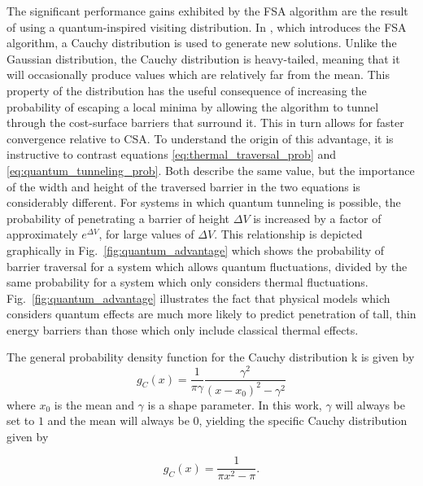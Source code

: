 \documentclass[11pt]{afthesis}
\begin{document}
	 The significant performance gains exhibited by the FSA algorithm are the result of using a quantum-inspired visiting distribution. In \cite{szu1987fastsimulatedannealing}, which introduces the FSA algorithm, a Cauchy distribution is used to generate new solutions. Unlike the Gaussian distribution, the Cauchy distribution is heavy-tailed, meaning that it will occasionally produce values which are relatively far from the mean.  This property of the distribution has the useful consequence of increasing the probability of escaping a local minima by allowing the algorithm to tunnel through the cost-surface barriers that surround it. This in turn allows for faster convergence relative to CSA. To understand the origin of this advantage, it is instructive to contrast equations \ref{eq:thermal_traversal_prob} and \ref{eq:quantum_tunneling_prob}. Both describe the same value, but the importance of the width and height of the traversed barrier in the two equations is considerably different. For systems in which quantum tunneling is possible, the probability of penetrating a barrier of height \begin{math} \Delta V \end{math} is increased by a factor of approximately \begin{math} e^{\Delta V} \end{math}, for large values of \begin{math} \Delta V \end{math}. This relationship is depicted graphically in Fig.~\ref{fig:quantum_advantage} which shows the probability of barrier traversal for a system which allows quantum fluctuations, divided by the same probability for a system which only considers thermal fluctuations. Fig.~\ref{fig:quantum_advantage} illustrates the fact that physical models which considers quantum effects are much more likely to predict penetration of tall, thin energy barriers than those which only include classical thermal effects. 
	 
	 The general probability density function for the Cauchy distribution k is given by	
	 \begin{equation*}
	 g_C(x) = \frac{1}{\pi\gamma}\frac{\gamma^2}{(x-x_0)^2 - \gamma^2}
	 \end{equation*}
	 \noindent where $x_0$ is the mean and $\gamma$ is a shape parameter. In this work, $\gamma$ will always be set to $1$ and the mean will always be $0$, yielding the specific Cauchy distribution given by
	 
	  \begin{equation}
	  g_C(x) = \frac{1}{\pi x^2 -\pi}.
	  \label{eq:cauchy_pdf}
	  \end{equation}
	  
\end{document}
